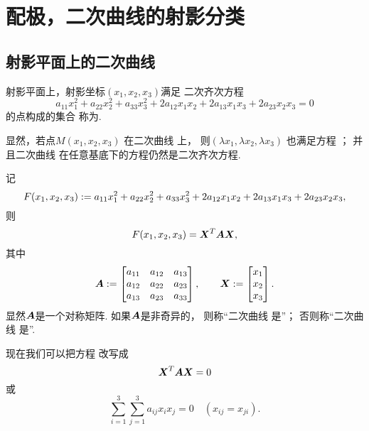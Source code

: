 \section{配极，二次曲线的射影分类}
\subsection{射影平面上的二次曲线}
射影平面上，射影坐标\((x_1,x_2,x_3)\)满足
二次齐次方程\begin{equation}\label{equation:配极.二次曲线的齐次射影坐标方程}
	a_{11} x_1^2
	+ a_{22} x_2^2
	+ a_{33} x_3^2
	+ 2 a_{12} x_1 x_2
	+ 2 a_{13} x_1 x_3
	+ 2 a_{23} x_2 x_3
	= 0
\end{equation}
的点构成的集合
称为.

显然，若点\(M(x_1,x_2,x_3)\)
在二次曲线  上，
则\((\lambda x_1,\lambda x_2,\lambda x_3)\)
也满足方程 ；
并且二次曲线 
在任意基底下的方程仍然是二次齐次方程.

记\begin{equation*}
	F(x_1,x_2,x_3)
	:=
	a_{11} x_1^2
	+ a_{22} x_2^2
	+ a_{33} x_3^2
	+ 2 a_{12} x_1 x_2
	+ 2 a_{13} x_1 x_3
	+ 2 a_{23} x_2 x_3,
\end{equation*}
则\begin{equation*}
	F(x_1,x_2,x_3)
	= \boldsymbol{X}^T \boldsymbol{A} \boldsymbol{X},
\end{equation*}
其中\begin{equation*}
	\boldsymbol{A}
	:=
	\begin{bmatrix}
		a_{11} & a_{12} & a_{13} \\
		a_{12} & a_{22} & a_{23} \\
		a_{13} & a_{23} & a_{33} \\
	\end{bmatrix},
	\qquad
	\boldsymbol{X}
	:=
	\begin{bmatrix}
		x_1 \\ x_2 \\ x_3
	\end{bmatrix}.
\end{equation*}
显然\(\boldsymbol{A}\)是一个对称矩阵.
如果\(\boldsymbol{A}\)是非奇异的，
则称“二次曲线  是”；
否则称“二次曲线  是”.

现在我们可以把方程 
改写成\begin{equation}
	\boldsymbol{X}^T \boldsymbol{A} \boldsymbol{X} = 0
\end{equation}
或\begin{equation}
	\sum_{i=1}^3 \sum_{j=1}^3 a_{ij} x_i x_j = 0
	\quad(x_{ij} = x_{ji}).
\end{equation}

